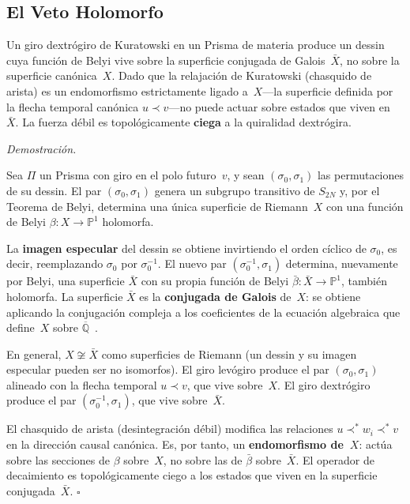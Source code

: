 \documentclass[11pt, a4paper, openany]{book}
\newcommand{\covers}{\prec^{\!*}}
\renewenvironment{proof}[1][Demostraci\'on]{%
  \par\noindent\textit{#1.}\quad
}{\hfill$\square$\par\medskip}
\begin{document}
\subsection{El Veto Holomorfo}

\begin{theorem}
\label{thm:parity-veto}
Un giro dextr\'ogiro de Kuratowski en un Prisma de materia produce un
dessin cuya funci\'on de Belyi vive sobre la superficie conjugada de
Galois~$\bar{X}$, no sobre la superficie can\'onica~$X$. Dado que la
relajaci\'on de Kuratowski (chasquido de arista) es un endomorfismo
estrictamente ligado a~$X$---la superficie definida por la flecha
temporal can\'onica $u \prec v$---no puede actuar sobre estados que
viven en~$\bar{X}$. La fuerza d\'ebil es topol\'ogicamente
\textbf{ciega} a la quiralidad dextr\'ogira.
\end{theorem}

\begin{proof}
Sea $\Pi$ un Prisma con giro en el polo futuro~$v$, y sean
$(\sigma_0, \sigma_1)$ las permutaciones de su dessin. El par
$(\sigma_0, \sigma_1)$ genera un subgrupo transitivo de $S_{2N}$
y, por el Teorema de Belyi, determina una \'unica superficie de
Riemann~$X$ con una funci\'on de Belyi
$\beta \colon X \to \mathbb{P}^1$ holomorfa.

La \textbf{imagen especular} del dessin se obtiene invirtiendo el
orden c\'iclico de $\sigma_0$, es decir, reemplazando $\sigma_0$ por
$\sigma_0^{-1}$. El nuevo par $(\sigma_0^{-1}, \sigma_1)$ determina,
nuevamente por Belyi, una superficie $\bar{X}$ con su propia funci\'on
de Belyi $\bar{\beta} \colon \bar{X} \to \mathbb{P}^1$, tambi\'en
holomorfa. La superficie $\bar{X}$ es la \textbf{conjugada de Galois}
de~$X$: se obtiene aplicando la conjugaci\'on compleja a los
coeficientes de la ecuaci\'on algebraica que define~$X$ sobre
$\overline{\mathbb{Q}}$~\cite{grothendieck1984,lando2004}.

En general, $X \not\cong \bar{X}$ como superficies de Riemann (un
dessin y su imagen especular pueden ser no isomorfos). El giro
lev\'ogiro produce el par $(\sigma_0, \sigma_1)$ alineado con la
flecha temporal $u \prec v$, que vive sobre~$X$. El giro dextr\'ogiro
produce el par $(\sigma_0^{-1}, \sigma_1)$, que vive sobre~$\bar{X}$.

El chasquido de arista (desintegraci\'on d\'ebil) modifica las
relaciones $u \covers w_i \covers v$ en la direcci\'on causal
can\'onica. Es, por tanto, un \textbf{endomorfismo de~$X$}: act\'ua
sobre las secciones de $\beta$ sobre~$X$, no sobre las de $\bar{\beta}$
sobre~$\bar{X}$. El operador de decaimiento es topol\'ogicamente
ciego a los estados que viven en la superficie conjugada~$\bar{X}$.
\end{proof}
\end{document}
